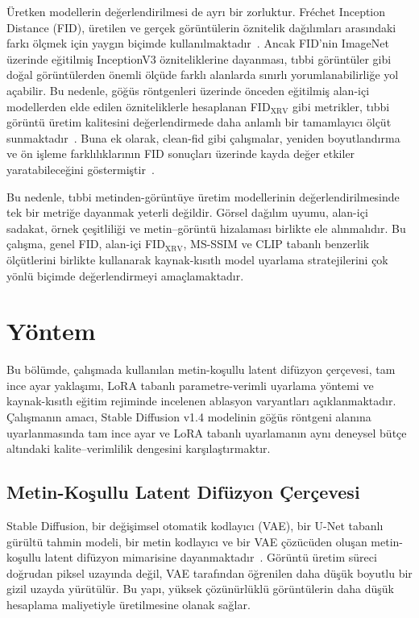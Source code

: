 \documentclass[11pt]{article}
\begin{document}
Üretken modellerin değerlendirilmesi de ayrı bir zorluktur. Fréchet Inception
Distance (FID), üretilen ve gerçek görüntülerin öznitelik dağılımları arasındaki
farkı ölçmek için yaygın biçimde kullanılmaktadır~\cite{fid}. Ancak FID'nin
ImageNet üzerinde eğitilmiş InceptionV3 özniteliklerine dayanması, tıbbi
görüntüler gibi doğal görüntülerden önemli ölçüde farklı alanlarda sınırlı
yorumlanabilirliğe yol açabilir. Bu nedenle, göğüs röntgenleri üzerinde
önceden eğitilmiş alan-içi modellerden elde edilen özniteliklerle hesaplanan
FID$_{\text{XRV}}$ gibi metrikler, tıbbi görüntü üretim kalitesini
değerlendirmede daha anlamlı bir tamamlayıcı ölçüt sunmaktadır~\cite{xrv}.
Buna ek olarak, clean-fid gibi çalışmalar, yeniden boyutlandırma ve ön işleme
farklılıklarının FID sonuçları üzerinde kayda değer etkiler yaratabileceğini
göstermiştir~\cite{cleanfid}.

Bu nedenle, tıbbi metinden-görüntüye üretim modellerinin değerlendirilmesinde
tek bir metriğe dayanmak yeterli değildir. Görsel dağılım uyumu, alan-içi
sadakat, örnek çeşitliliği ve metin--görüntü hizalaması birlikte ele
alınmalıdır. Bu çalışma, genel FID, alan-içi FID$_{\text{XRV}}$, MS-SSIM ve
CLIP tabanlı benzerlik ölçütlerini birlikte kullanarak kaynak-kısıtlı model
uyarlama stratejilerini çok yönlü biçimde değerlendirmeyi amaçlamaktadır.


\section{Yöntem}
\label{sec:method}

Bu bölümde, çalışmada kullanılan metin-koşullu latent difüzyon çerçevesi,
tam ince ayar yaklaşımı, LoRA tabanlı parametre-verimli uyarlama yöntemi ve
kaynak-kısıtlı eğitim rejiminde incelenen ablasyon varyantları açıklanmaktadır.
Çalışmanın amacı, Stable Diffusion v1.4 modelinin göğüs röntgeni alanına
uyarlanmasında tam ince ayar ve LoRA tabanlı uyarlamanın aynı deneysel bütçe
altındaki kalite--verimlilik dengesini karşılaştırmaktır.

\subsection{Metin-Koşullu Latent Difüzyon Çerçevesi}

Stable Diffusion, bir değişimsel otomatik kodlayıcı (VAE), bir U-Net tabanlı
gürültü tahmin modeli, bir metin kodlayıcı ve bir VAE çözücüden oluşan
metin-koşullu latent difüzyon mimarisine dayanmaktadır~\cite{ldm}. Görüntü
üretim süreci doğrudan piksel uzayında değil, VAE tarafından öğrenilen daha
düşük boyutlu bir gizil uzayda yürütülür. Bu yapı, yüksek çözünürlüklü
görüntülerin daha düşük hesaplama maliyetiyle üretilmesine olanak sağlar.
\end{document}
